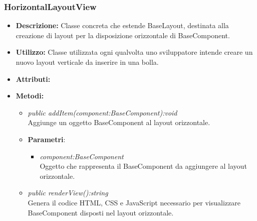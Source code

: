 \subsubsection{HorizontalLayoutView}
\begin{itemize}
\item \textbf{Descrizione:} Classe concreta che estende BaseLayout, destinata alla creazione di layout  per la disposizione orizzontale di BaseComponent.
\item \textbf{Utilizzo:} Classe utilizzata ogni qualvolta uno sviluppatore intende creare un nuovo layout verticale da inserire in una bolla.
\item \textbf{Attributi:}
\item \textbf{Metodi:}
\begin{itemize}
\item \textit{public addItem(component:BaseComponent):void}\\
Aggiunge un oggetto BaseComponent al layout orizzontale.
\item{\textbf{Parametri}: \begin{itemize}
\item \textit{component:BaseComponent}\\
Oggetto che rappresenta il BaseComponent da aggiungere al layout orizzontale.
\end{itemize}}
\item \textit{public renderView():string}\\
Genera il codice HTML, CSS e JavaScript necessario per visualizzare BaseComponent disposti nel layout orizzontale.
\end{itemize}
\end{itemize}